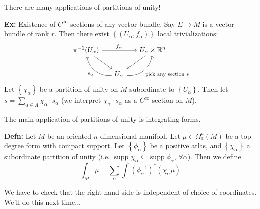 \documentclass[10pt,letterpaper]{article}
\newcommand{\n}{\hfill\break}
\newcommand{\nn}{\vspace{0.5\baselineskip}\n}
\newcommand{\hangblock}[2]{\par\noindent\settowidth{\hangindent}{\textbf{#1: }}\textbf{#1: }\nolinebreak#2}
\newcommand{\defn}[1]{\hangblock{Defn}{#1}}
\newcommand{\ex}[1]{\hangblock{Ex}{#1}}
\newcommand{\ptxt}[1]{\textrm{\textnormal{#1}}}
\newcommand{\set}[1]{\left\{#1\right\}}
\newcommand{\reals}{\mathbb{R}}
\newcommand{\R}{\reals}
\newcommand{\inv}{^{-1}}
\DeclareMathOperator{\supp}{supp}
\begin{document}
\par\noindent
There are many applications of partitions of unity!

\ex{
	Existence of $C^{\infty}$ sections of any vector bundle.\nn
	Say $E\to{}M$ is a vector bundle of rank $r$. Then there exist $\set{(U_{\alpha},f_{\alpha})}$ local trivializations:
	\[
		\begin{tikzcd}[ampersand replacement=\&]
			\pi\inv(U_{\alpha}) \arrow[rr, "f_{\alpha}"] \arrow[dr] \&[-10pt] \&[-10pt] U_{\alpha}\times\R^{n} \arrow[dl]\\
			\& U_{\alpha} \arrow[ul, bend left=45, "s_{\alpha}"] \arrow[ur, bend right=45, "\ptxt{pick any section $s$}", swap]
		\end{tikzcd}
	\]
	Let $\set{\chi_{\alpha}}$ be a partition of unity on $M$ subordinate to $\set{U_{\alpha}}$. Then let $s=\sum_{\alpha\in{}A}\chi_{\alpha}\cdot{}s_{\alpha}$ (we interpret $\chi_{\alpha}\cdot{}s_{\alpha}$ as a $C^{\infty}$ section on $M$).\n
}

\par\noindent
The main application of partitions of unity is integrating forms.\n

\defn{
	Let $M$ be an oriented $n$-dimensional manifold. Let $\mu\in\Omega^{n}_{0}(M)$ be a top degree form with compact support. Let $\set{\phi_{\alpha}}$ be a positive atlas, and $\set{\chi_{\alpha}}$ a subordinate partition of unity (i.e. $\supp\chi_{\alpha}\subseteq\supp\phi_{\alpha}$, $\forall\alpha$). Then we define
	\[
		\int_{M}\mu=\sum_{\alpha}\int(\phi_{\alpha}\inv)^{*}(\chi_{\alpha}\mu)
	\]
}

\par\noindent
We have to check that the right hand side is independent of choice of coordinates. We'll do this next time...
\end{document}
